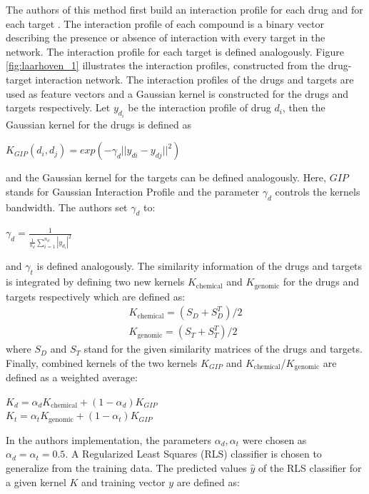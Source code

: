 The authors of this method first build an interaction profile for each drug and for each target \cite{van2011gaussian}. The interaction profile of each compound is a binary vector describing the presence or absence of interaction with every target in the network. The interaction profile for each target is defined analogously. Figure \ref{fig:laarhoven_1} illustrates the interaction profiles, constructed from the drug-target interaction network. The interaction profiles of the drugs and targets are used as feature vectors and a Gaussian kernel is constructed for the drugs and targets respectively. Let $y_{d_i}$ be the interaction profile of drug $d_i$, then the Gaussian kernel for the drugs is defined as
\begin{center}
$K_{GIP}(d_i,d_j) = exp(-\gamma_d || y_{di}-y_{dj} ||^2)$
\end{center}
and the Gaussian kernel for the targets can be defined analogously. Here, $GIP$ stands for Gaussian Interaction Profile and the parameter $\gamma_d$ controls the kernels bandwidth. The authors set $\gamma_d$ to:
\begin{center}
$\gamma_d = \frac{1}{\frac{1}{n_d}\sum\limits_{i=1}^{n_d}|y_{d_i}|^2}$
\end{center}
and $\gamma_t$ is defined analogously. 
The similarity information of the drugs and targets is integrated by defining two new kernels $K_{\text{chemical}}$ and $K_{\text{genomic}}$ for the drugs and targets respectively which are defined as:
\begin{equation}
\begin{split}
K_{\text{chemical}} = (S_D+S_D^T)/2 \\
K_{\text{genomic}} = (S_T+S_T^T)/2
\end{split}
\end{equation}
where $S_D$ and $S_T$ stand for the given similarity matrices of the drugs and targets. Finally, combined kernels of the two kernels $K_{GIP}$ and $K_{\text{chemical}}$/$K_{\text{genomic}}$ are defined as a weighted average:
\begin{center}
$K_d=\alpha_dK_{\text{chemical}}+(1-\alpha_d)K_{GIP}$\\
$K_t =\alpha_tK_{\text{genomic}}+(1-\alpha_t)K_{GIP}$
\end{center}
In the authors implementation, the parameters $\alpha_d, \alpha_t$ were chosen as $\alpha_d = \alpha_t = 0.5$.
A Regularized Least Squares (RLS) classifier is chosen to generalize from the training data. The predicted values $\hat{y}$ of the RLS classifier for a given kernel $K$ and training vector $y$ are defined as:
